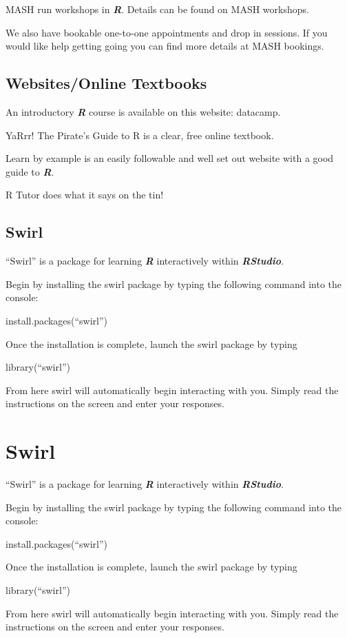 \documentclass[
]{book}
\begin{document}
MASH run workshops in \textbf{\emph{R}}. Details can be found on MASH workshops.

We also have bookable one-to-one appointments and drop in sessions. If you would like help getting going you can find more details at MASH bookings.

\section{Websites/Online Textbooks}\label{websitesonline-textbooks}

An introductory \textbf{\emph{R}} course is available on this website: datacamp.

YaRrr! The Pirate's Guide to R is a clear, free online textbook.

Learn by example is an easily followable and well set out website with a good guide to \textbf{\emph{R}}.

R Tutor does what it says on the tin!

\section{Swirl}\label{swirl-1}

``Swirl'' is a package for learning \textbf{\emph{R}} interactively within \textbf{\emph{RStudio}}.

Begin by installing the swirl package by typing the following command into the console:

install.packages(``swirl'')

Once the installation is complete, launch the swirl package by typing

library(``swirl'')

From here swirl will automatically begin interacting with you. Simply read the instructions on the screen and enter your responses.

\chapter{Swirl}\label{swirl-2}

``Swirl'' is a package for learning \textbf{\emph{R}} interactively within \textbf{\emph{RStudio}}.

Begin by installing the swirl package by typing the following command into the console:

install.packages(``swirl'')

Once the installation is complete, launch the swirl package by typing

library(``swirl'')

From here swirl will automatically begin interacting with you. Simply read the instructions on the screen and enter your responses.

  
\end{document}
